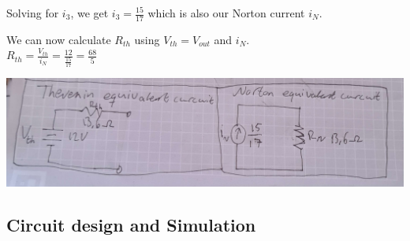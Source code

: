 \documentclass[11pt]{article}
\begin{document}
\noindent
Solving for $i_{3}$, we get $i_{3} = \frac{15}{17}$ which is also our Norton current $i_{N}$.

\noindent
We can now calculate $R_{th}$ using $V_{th} = V_{out}$ and $i_{N}$. \\
$R_{th} = \frac{V_{th}}{i_{N}} = \frac{12}{\frac{15}{17}} = \frac{68}{5}$

\includegraphics[width=\linewidth]{4.1curcuits.jpg}

\subsection[25pt]{\bf{Circuit design and Simulation}}
\end{document}
